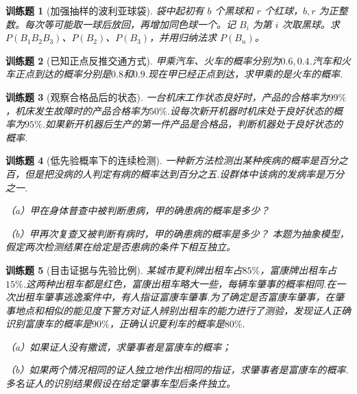 \documentclass[UTF8,12pt,a4paper,fontset=fandol]{ctexbook}
\newtheorem{exercise}{训练题}[section]
\begin{document}
\begin{exercise}[加强抽样的波利亚球袋]\label{q:Y2.20}
袋中起初有 $b$ 个黑球和 $r$ 个红球，$b,r$ 为正整数。每次等可能取一球后放回，再增加同色球一个。记 $B_i$ 为第 $i$ 次取黑球。求 $P(B_1B_2B_3)$、$P(B_2)$、$P(B_3)$，并用归纳法求 $P(B_n)$。\par{}\end{exercise}

\begin{exercise}[已知正点反推交通方式]\label{q:Y2.21}
甲乘汽车、火车的概率分别为$0.6,0.4$.汽车和火车正点到达的概率分别是$0.8$和$0.9$.现在甲已经正点到达，求甲乘的是火车的概率.\par{}\end{exercise}

\begin{exercise}[观察合格品后的状态]\label{q:Y2.22}
一台机床工作状态良好时，产品的合格率为$99\%$，机床发生故障时的产品合格率为$50\%$.设每次新开机器时机床处于良好状态的概率为$95\%$.如果新开机器后生产的第一件产品是合格品，判断机器处于良好状态的概率.\par{}\end{exercise}

\begin{exercise}[低先验概率下的连续检测]\label{q:Y2.23}
一种新方法检测出某种疾病的概率是百分之百，但是把没病的人判定有病的概率达到百分之五.设群体中该病的发病率是万分之一.

（a）甲在身体普查中被判断患病，甲的确患病的概率是多少？

（b）甲再次复查又被判断有病时，甲的确患病的概率是多少？ 本题为抽象模型，假定两次检测结果在给定是否患病的条件下相互独立。\par{}\end{exercise}

\begin{exercise}[目击证据与先验比例]\label{q:Y2.25}
某城市夏利牌出租车占$85\%$，富康牌出租车占$15\%$.这两种出租车都是红色，富康出租车略大一些，每辆车肇事的概率相同.在一次出租车肇事逃逸案件中，有人指证富康车肇事.为了确定是否富康车肇事，在肇事地点和相似的能见度下警方对证人辨别出租车的能力进行了测验，发现证人正确识别富康车的概率是$90\%$，正确认识夏利车的概率是$80\%$.

（a）如果证人没有撒谎，求肇事者是富康车的概率；

（b）如果两个情况相同的证人独立地作出相同的指证，求肇事者是富康车的概率. 多名证人的识别结果假设在给定肇事车型后条件独立。\par{}\end{exercise}
\end{document}
